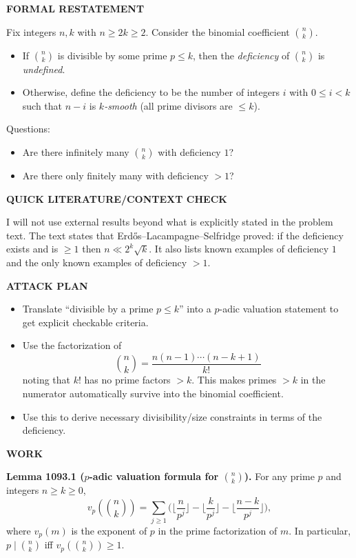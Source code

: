 
\textbf{FORMAL RESTATEMENT}

Fix integers $n,k$ with $n\ge 2k\ge 2$.
Consider the binomial coefficient $\binom{n}{k}$.

\begin{itemize}
\item If $\binom{n}{k}$ is divisible by some prime $p\le k$, then the \emph{deficiency} of $\binom{n}{k}$ is \emph{undefined}.
\item Otherwise, define the deficiency to be the number of integers $i$ with $0\le i<k$ such that $n-i$ is \emph{$k$-smooth} (all prime divisors are $\le k$).
\end{itemize}

Questions:
\begin{itemize}
\item Are there infinitely many $\binom{n}{k}$ with deficiency $1$?
\item Are there only finitely many with deficiency $>1$?
\end{itemize}

\textbf{QUICK LITERATURE/CONTEXT CHECK}

I will not use external results beyond what is explicitly stated in the problem text.
The text states that Erd\H{o}s--Lacampagne--Selfridge proved: if the deficiency exists and is $\ge 1$ then $n\ll 2^k\sqrt{k}$.
It also lists known examples of deficiency $1$ and the only known examples of deficiency $>1$.

\textbf{ATTACK PLAN}

\begin{itemize}
\item Translate ``divisible by a prime $p\le k$'' into a $p$-adic valuation statement to get explicit checkable criteria.
\item Use the factorization of
\[\binom{n}{k}=\frac{n(n-1)\cdots(n-k+1)}{k!}
\]
noting that $k!$ has no prime factors $>k$.
This makes primes $>k$ in the numerator automatically survive into the binomial coefficient.
\item Use this to derive necessary divisibility/size constraints in terms of the deficiency.
\end{itemize}

\textbf{WORK}

\textbf{Lemma 1093.1 ($p$-adic valuation formula for $\binom{n}{k}$).}
For any prime $p$ and integers $n\ge k\ge 0$,
\[v_p\!\left(\binom{n}{k}\right)=\sum_{j\ge 1}\Big(\Big\lfloor\frac{n}{p^j}\Big\rfloor-\Big\lfloor\frac{k}{p^j}\Big\rfloor-\Big\lfloor\frac{n-k}{p^j}\Big\rfloor\Big),
\]
where $v_p(m)$ is the exponent of $p$ in the prime factorization of $m$.
In particular, $p\mid \binom{n}{k}$ iff $v_p\!\left(\binom{n}{k}\right)\ge 1$.

